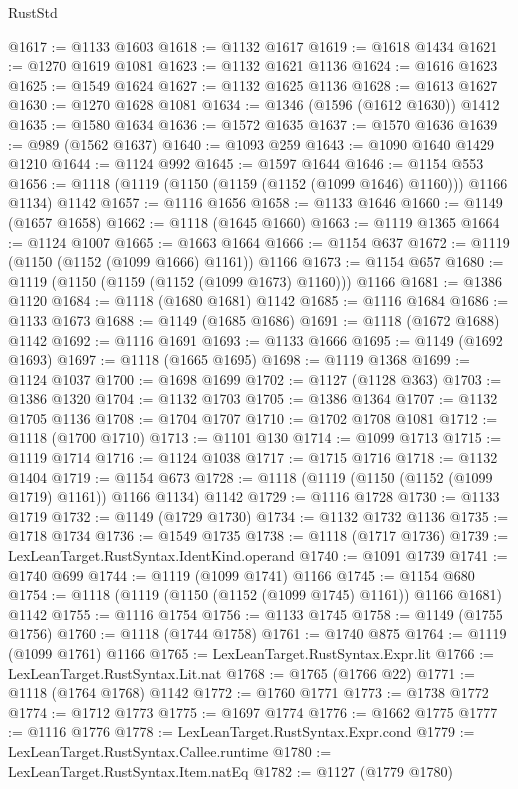 \begin{lexlean}{RustStd}
\begin{coremodule}
@1617 := @1133 @1603
@1618 := @1132 @1617
@1619 := @1618 @1434
@1621 := @1270 @1619 @1081
@1623 := @1132 @1621 @1136
@1624 := @1616 @1623
@1625 := @1549 @1624
@1627 := @1132 @1625 @1136
@1628 := @1613 @1627
@1630 := @1270 @1628 @1081
@1634 := @1346 (@1596 (@1612 @1630)) @1412
@1635 := @1580 @1634
@1636 := @1572 @1635
@1637 := @1570 @1636
@1639 := @989 (@1562 @1637)
@1640 := @1093 @259
@1643 := @1090 @1640 @1429 @1210
@1644 := @1124 @992
@1645 := @1597 @1644
@1646 := @1154 @553
@1656 := @1118 (@1119 (@1150 (@1159 (@1152 (@1099 @1646) @1160))) @1166 @1134) @1142
@1657 := @1116 @1656
@1658 := @1133 @1646
@1660 := @1149 (@1657 @1658)
@1662 := @1118 (@1645 @1660)
@1663 := @1119 @1365
@1664 := @1124 @1007
@1665 := @1663 @1664
@1666 := @1154 @637
@1672 := @1119 (@1150 (@1152 (@1099 @1666) @1161)) @1166
@1673 := @1154 @657
@1680 := @1119 (@1150 (@1159 (@1152 (@1099 @1673) @1160))) @1166
@1681 := @1386 @1120
@1684 := @1118 (@1680 @1681) @1142
@1685 := @1116 @1684
@1686 := @1133 @1673
@1688 := @1149 (@1685 @1686)
@1691 := @1118 (@1672 @1688) @1142
@1692 := @1116 @1691
@1693 := @1133 @1666
@1695 := @1149 (@1692 @1693)
@1697 := @1118 (@1665 @1695)
@1698 := @1119 @1368
@1699 := @1124 @1037
@1700 := @1698 @1699
@1702 := @1127 (@1128 @363)
@1703 := @1386 @1320
@1704 := @1132 @1703
@1705 := @1386 @1364
@1707 := @1132 @1705 @1136
@1708 := @1704 @1707
@1710 := @1702 @1708 @1081
@1712 := @1118 (@1700 @1710)
@1713 := @1101 @130
@1714 := @1099 @1713
@1715 := @1119 @1714
@1716 := @1124 @1038
@1717 := @1715 @1716
@1718 := @1132 @1404
@1719 := @1154 @673
@1728 := @1118 (@1119 (@1150 (@1152 (@1099 @1719) @1161)) @1166 @1134) @1142
@1729 := @1116 @1728
@1730 := @1133 @1719
@1732 := @1149 (@1729 @1730)
@1734 := @1132 @1732 @1136
@1735 := @1718 @1734
@1736 := @1549 @1735
@1738 := @1118 (@1717 @1736)
@1739 := LexLeanTarget.RustSyntax.IdentKind.operand
@1740 := @1091 @1739
@1741 := @1740 @699
@1744 := @1119 (@1099 @1741) @1166
@1745 := @1154 @680
@1754 := @1118 (@1119 (@1150 (@1152 (@1099 @1745) @1161)) @1166 @1681) @1142
@1755 := @1116 @1754
@1756 := @1133 @1745
@1758 := @1149 (@1755 @1756)
@1760 := @1118 (@1744 @1758)
@1761 := @1740 @875
@1764 := @1119 (@1099 @1761) @1166
@1765 := LexLeanTarget.RustSyntax.Expr.lit
@1766 := LexLeanTarget.RustSyntax.Lit.nat
@1768 := @1765 (@1766 @22)
@1771 := @1118 (@1764 @1768) @1142
@1772 := @1760 @1771
@1773 := @1738 @1772
@1774 := @1712 @1773
@1775 := @1697 @1774
@1776 := @1662 @1775
@1777 := @1116 @1776
@1778 := LexLeanTarget.RustSyntax.Expr.cond
@1779 := LexLeanTarget.RustSyntax.Callee.runtime
@1780 := LexLeanTarget.RustSyntax.Item.natEq
@1782 := @1127 (@1779 @1780)

\end{coremodule}
\end{lexlean}
